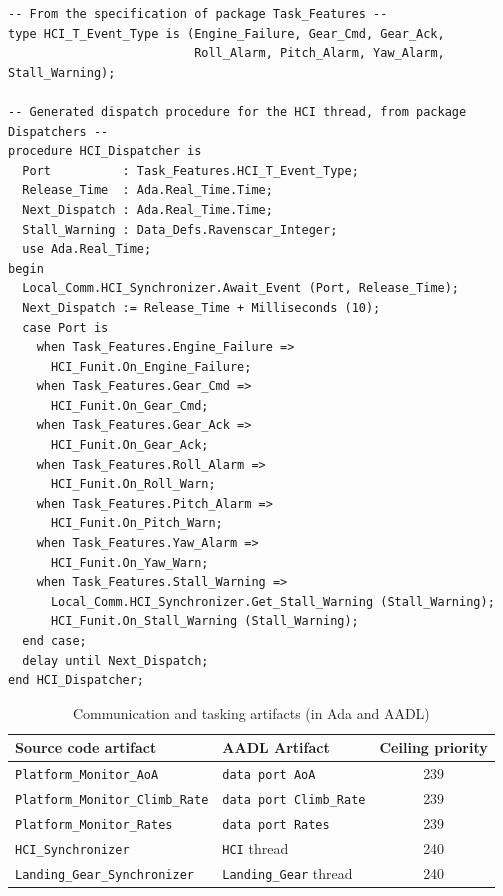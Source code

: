 \begin{minipage}{\listingwidth}
\lstset{language=ada}
\begin{lstlisting}[label=lst:hci_dispatcher,caption=The dispatcher
    procedure for the \texttt{HCI} task]
-- From the specification of package Task_Features --
type HCI_T_Event_Type is (Engine_Failure, Gear_Cmd, Gear_Ack, 
                          Roll_Alarm, Pitch_Alarm, Yaw_Alarm, Stall_Warning);

-- Generated dispatch procedure for the HCI thread, from package Dispatchers --
procedure HCI_Dispatcher is
  Port          : Task_Features.HCI_T_Event_Type;
  Release_Time  : Ada.Real_Time.Time;
  Next_Dispatch : Ada.Real_Time.Time;
  Stall_Warning : Data_Defs.Ravenscar_Integer;
  use Ada.Real_Time;
begin
  Local_Comm.HCI_Synchronizer.Await_Event (Port, Release_Time);
  Next_Dispatch := Release_Time + Milliseconds (10);
  case Port is
    when Task_Features.Engine_Failure =>
      HCI_Funit.On_Engine_Failure;
    when Task_Features.Gear_Cmd =>
      HCI_Funit.On_Gear_Cmd;
    when Task_Features.Gear_Ack =>
      HCI_Funit.On_Gear_Ack;
    when Task_Features.Roll_Alarm =>
      HCI_Funit.On_Roll_Warn;
    when Task_Features.Pitch_Alarm =>
      HCI_Funit.On_Pitch_Warn;
    when Task_Features.Yaw_Alarm =>
      HCI_Funit.On_Yaw_Warn;
    when Task_Features.Stall_Warning =>
      Local_Comm.HCI_Synchronizer.Get_Stall_Warning (Stall_Warning);
      HCI_Funit.On_Stall_Warning (Stall_Warning);
  end case;
  delay until Next_Dispatch;
end HCI_Dispatcher;
\end{lstlisting}
\end{minipage}

\begin{table}
\centering
\begin{tabular}{|l|l|c|}
\hline
\textbf{Source code artifact} & \textbf{AADL Artifact} &
\textbf{Ceiling priority}\\
\hline
\texttt{Platform\_Monitor\_AoA} & \texttt{data port AoA} & 239\\
\texttt{Platform\_Monitor\_Climb\_Rate} & \texttt{data port
  Climb\_Rate} & 239\\
\texttt{Platform\_Monitor\_Rates} & \texttt{data port Rates} & 239\\
\texttt{HCI\_Synchronizer} & \texttt{HCI} thread & 240\\
\texttt{Landing\_Gear\_Synchronizer} & \texttt{Landing\_Gear} thread &
240\\
\hline
\end{tabular}
\caption{Communication and tasking artifacts (in Ada and AADL)}
\label{tab:cs_local_comm}
\end{table}

